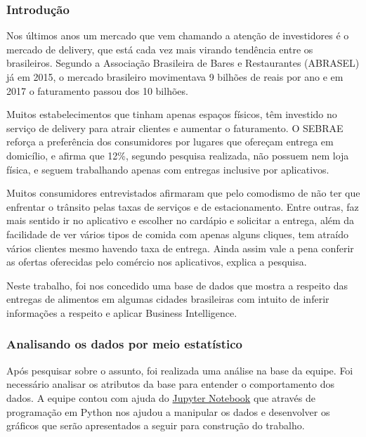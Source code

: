 \documentclass[11pt]{article}
\begin{document}
\subsubsection{Introdução}\label{introduuxe7uxe3o}

Nos últimos anos um mercado que vem chamando a atenção de investidores é
o mercado de delivery, que está cada vez mais virando tendência entre os
brasileiros. Segundo a Associação Brasileira de Bares e Restaurantes
(ABRASEL) já em 2015, o mercado brasileiro movimentava 9 bilhões de
reais por ano e em 2017 o faturamento passou dos 10 bilhões.

Muitos estabelecimentos que tinham apenas espaços físicos, têm investido
no serviço de delivery para atrair clientes e aumentar o faturamento. O
SEBRAE reforça a preferência dos consumidores por lugares que ofereçam
entrega em domicílio, e afirma que 12\%, segundo pesquisa realizada, não
possuem nem loja física, e seguem trabalhando apenas com entregas
inclusive por aplicativos.

Muitos consumidores entrevistados afirmaram que pelo comodismo de não
ter que enfrentar o trânsito pelas taxas de serviços e de
estacionamento. Entre outras, faz mais sentido ir no aplicativo e
escolher no cardápio e solicitar a entrega, além da facilidade de ver
vários tipos de comida com apenas alguns cliques, tem atraído vários
clientes mesmo havendo taxa de entrega. Ainda assim vale a pena conferir
as ofertas oferecidas pelo comércio nos aplicativos, explica a pesquisa.

Neste trabalho, foi nos concedido uma base de dados que mostra a
respeito das entregas de alimentos em algumas cidades brasileiras com
intuito de inferir informações a respeito e aplicar Business
Intelligence.

\subsubsection{Analisando os dados por meio
estatístico}\label{analisando-os-dados-por-meio-estatuxedstico}

Após pesquisar sobre o assunto, foi realizada uma análise na base da
equipe. Foi necessário analisar os atributos da base para entender o
comportamento dos dados. A equipe contou com ajuda do
\href{http://jupyter.org/}{Jupyter Notebook} que através de programação
em Python nos ajudou a manipular os dados e desenvolver os gráficos que
serão apresentados a seguir para construção do trabalho.
\end{document}
